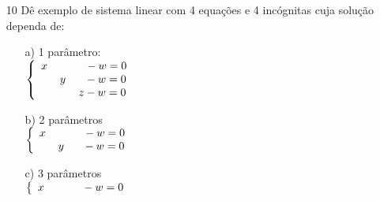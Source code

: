 \documentclass[a4paper]{article}
\newtheorem{theorem}{Theorem}[section]
\newenvironment{proof}[1][Proof]{\begin{trivlist}
\item[\hskip \labelsep {\bfseries #1}]}{\end{trivlist}}
\begin{document}
\begin{itemize}
\item[10] Dê exemplo de sistema linear com 4 equações e 4 incógnitas cuja solução dependa de:
\begin{enumerate}
\item[a)] 1 parâmetro:
\\
\textcolor[rgb]{0,0,1}{$ \left\{
\begin{array}{lll}
\displaystyle x \hspace{12mm} - w = 0 \\
\displaystyle \hspace{6mm} y \hspace{6mm} - w = 0 \\
\displaystyle \hspace{12mm} z - w = 0
\end{array}
\right.
$}
\item[b)] 2 parâmetros
\\
\textcolor[rgb]{0,0,1}{$ \left\{
\begin{array}{ll}
\displaystyle x \hspace{12mm} - w = 0 \\
\displaystyle \hspace{6mm} y \hspace{6mm} - w = 0
\end{array}
\right.
$}
\item[c)] 3 parâmetros
\\
\textcolor[rgb]{0,0,1}{$ \left\{
\begin{array}{l}
\displaystyle x \hspace{12mm} - w = 0
\end{array}
\right.
$}
\end{enumerate}

\end{itemize}

%
%
%
%
%
\end{document}
